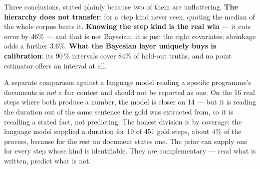 \documentclass[11pt]{article}
\begin{document}
Three conclusions, stated plainly because two of them are unflattering. \textbf{The hierarchy does not
transfer}: for a step kind never seen, quoting the median of the whole corpus beats it. \textbf{Knowing
the step kind is the real win} --- it cuts error by $46\%$ --- and that is not Bayesian, it is just the
right covariates; shrinkage adds a further $3.6\%$. \textbf{What the Bayesian layer uniquely buys is
calibration}: its 90\,\% intervals cover $84\%$ of held-out truths, and no point estimator offers an
interval at all.

A separate comparison against a language model reading a specific programme's documents is
\emph{not} a fair contest and should not be reported as one. On the 16 real steps where both produce a
number, the model is closer on 14 --- but it is reading the duration out of the same sentence the gold
was extracted from, so it is recalling a stated fact, not predicting. The honest division is by coverage:
the language model supplied a duration for 19 of 451 gold steps, about $4\%$ of the process, because for
the rest no document states one. The prior can supply one for every step whose kind is identifiable.
They are complementary --- read what is written, predict what is not.
\end{document}
